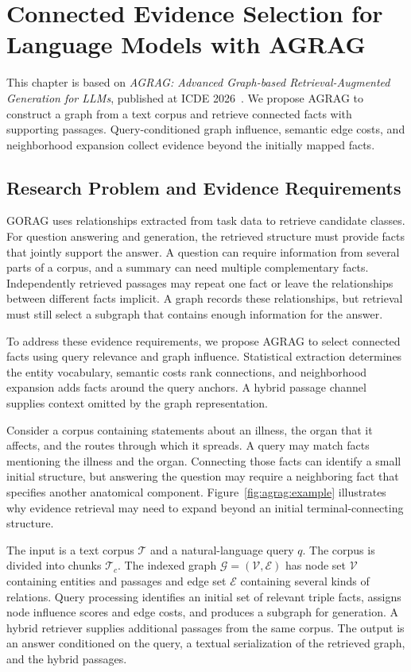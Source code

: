 \chapter{Connected Evidence Selection for Language Models with AGRAG}
\label{ch:agrag}

This chapter is based on \emph{AGRAG: Advanced Graph-based Retrieval-Augmented Generation for LLMs}, published at ICDE 2026~\cite{agrag-paper}. We propose AGRAG to construct a graph from a text corpus and retrieve connected facts with supporting passages. Query-conditioned graph influence, semantic edge costs, and neighborhood expansion collect evidence beyond the initially mapped facts.

\section{Research Problem and Evidence Requirements}
\label{sec:agrag:problem}
GORAG uses relationships extracted from task data to retrieve candidate classes. For question answering and generation, the retrieved structure must provide facts that jointly support the answer. A question can require information from several parts of a corpus, and a summary can need multiple complementary facts. Independently retrieved passages may repeat one fact or leave the relationships between different facts implicit. A graph records these relationships, but retrieval must still select a subgraph that contains enough information for the answer.

To address these evidence requirements, we propose AGRAG to select connected facts using query relevance and graph influence. Statistical extraction determines the entity vocabulary, semantic costs rank connections, and neighborhood expansion adds facts around the query anchors. A hybrid passage channel supplies context omitted by the graph representation.

Consider a corpus containing statements about an illness, the organ that it affects, and the routes through which it spreads. A query may match facts mentioning the illness and the organ. Connecting those facts can identify a small initial structure, but answering the question may require a neighboring fact that specifies another anatomical component. Figure~\ref{fig:agrag:example} illustrates why evidence retrieval may need to expand beyond an initial terminal-connecting structure.

The input is a text corpus $\mathcal{T}$ and a natural-language query $q$. The corpus is divided into chunks $\mathcal{T}_c$. The indexed graph $\mathcal{G}=(\mathcal{V},\mathcal{E})$ has node set $\mathcal V$ containing entities and passages and edge set $\mathcal E$ containing several kinds of relations. Query processing identifies an initial set of relevant triple facts, assigns node influence scores and edge costs, and produces a subgraph for generation. A hybrid retriever supplies additional passages from the same corpus. The output is an answer conditioned on the query, a textual serialization of the retrieved graph, and the hybrid passages.

